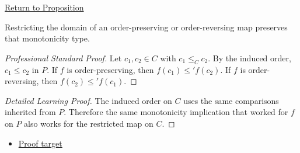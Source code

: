 \newpage
{}
\label{prf:restriction-preserves-monotonicity}

\begin{remark*}[Return]
\hyperref[prop:restriction-preserves-monotonicity]{Return to Proposition}
\end{remark*}

\begin{proposition*}
Restricting the domain of an order-preserving or order-reversing map preserves
that monotonicity type.
\end{proposition*}

\begin{proof}[Professional Standard Proof]
\LRAProofBodyStart
Let $c_1,c_2\in C$ with $c_1\leq_C c_2$. By the induced order,
$c_1\leq c_2$ in $P$. If $f$ is order-preserving, then
$f(c_1)\leq' f(c_2)$. If $f$ is order-reversing, then
$f(c_2)\leq' f(c_1)$.
\end{proof}

\begin{proof}[Detailed Learning Proof]
\LRAProofBodyStart
The induced order on $C$ uses the same comparisons inherited from $P$.
Therefore the same monotonicity implication that worked for $f$ on $P$ also
works for the restricted map on $C$.
\end{proof}
\begin{remark*}
\end{remark*}



\begin{dependencies}
\begin{itemize}
  \item \hyperref[prop:restriction-preserves-monotonicity]{Proof target}
\end{itemize}
\end{dependencies}

\clearpage

